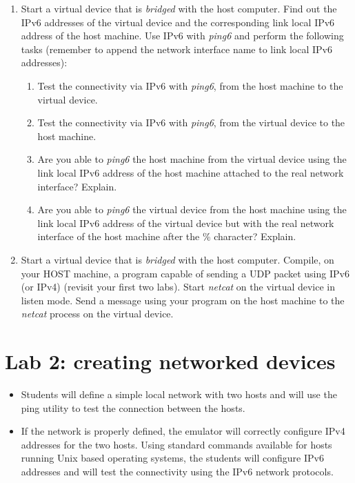 \documentclass[12pt]{book}
\begin{document}
\begin{enumerate}
\item Start a virtual device that is \emph{bridged} with the host computer. Find out the IPv6 addresses of the virtual device and the corresponding link local IPv6 address of the host machine. Use IPv6 with \emph{ping6} and perform the following tasks (remember to append the network interface name to link local IPv6 addresses):
\begin{enumerate}[label=(\alph*)]
\item Test the connectivity via IPv6 with \emph{ping6}, from the host machine to the virtual device.
\item Test the connectivity via IPv6 with \emph{ping6}, from the virtual device to the host machine.
\item Are you able to \emph{ping6} the host machine from the virtual device using the link local IPv6 address of the host machine attached to the real network interface? Explain.
\item Are you able to \emph{ping6} the virtual device from the host machine using the link local IPv6 address of the virtual device but with the real network interface of the host machine after the \% character? Explain.
\end{enumerate}

\item Start a virtual device that is \emph{bridged} with the host computer. Compile, on your HOST machine, a program capable of sending a UDP packet using IPv6 (or IPv4) (revisit your first two labs). Start \emph{netcat} on the virtual device in listen mode. Send a message using your program on the host machine to the \emph{netcat} process on the virtual device.
\end{enumerate}


\chapter{Lab 2: creating networked devices}



\begin{itemize}[label=--]
\item Students will define a simple local network with
  two hosts and
  will use the ping utility to test the connection between the hosts.

\item If the network is properly defined, the emulator will correctly
  configure IPv4 addresses for the two hosts. Using standard commands
  available for hosts running Unix based operating systems, the
  students will configure IPv6 addresses and will test the
  connectivity using the IPv6 network protocols.

\end{itemize}
\end{document}
